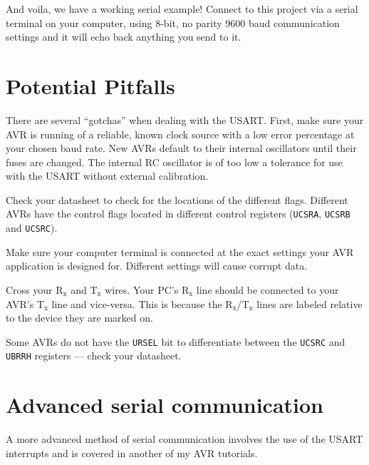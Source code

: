 \documentclass[a4paper,oneside]{book}
\newcommand{\subscript}[1]{\ensuremath{_{\textrm{#1}}}}
\begin{document}
And voila, we have a working serial example! Connect to this project via a serial terminal on your computer, using 8-bit, no parity 9600 baud communication settings and it will echo back anything you send to it.


\chapter{Potential Pitfalls}

There are several ``gotchas'' when dealing with the USART. First, make sure your AVR is running of a reliable, known clock source with a low error percentage at your chosen baud rate. New AVRs default to their internal oscillators until their fuses are changed. The internal RC oscillator is of too low a tolerance for use with the USART without external calibration.

Check your datasheet to check for the locations of the different flags. Different AVRs have the control flags located in different control registers (\texttt{UCSRA}, \texttt{UCSRB} and \texttt{UCSRC}).

Make sure your computer terminal is connected at the exact settings your AVR application is designed for. Different settings will cause corrupt data.

Cross your R\subscript{x} and T\subscript{x} wires. Your PC's R\subscript{x} line should be connected to your AVR's T\subscript{x} line and vice-versa. This is because the R\subscript{x}/T\subscript{x} lines are labeled relative to the device they are marked on.

Some AVRs do not have the \texttt{URSEL} bit to differentiate between the \texttt{UCSRC} and \texttt{UBRRH} registers --- check your datasheet.


\chapter{Advanced serial communication}

A more advanced method of serial communication involves the use of the USART interrupts and is covered in another of my AVR tutorials.
\end{document}
